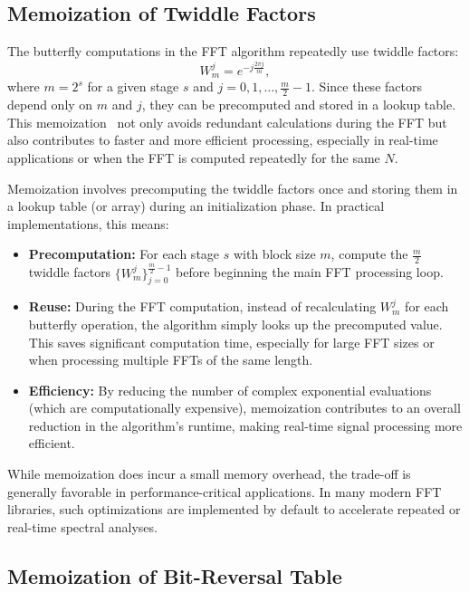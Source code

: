 \documentclass[12pt,letter]{article}
\begin{document}
\subsection{Memoization of Twiddle Factors}

The butterfly computations in the FFT algorithm repeatedly use twiddle
factors:
$$
W_m^j = e^{-j\frac{2\pi j}{m}},
$$
where $m = 2^s$ for a given stage $s$ and $j = 0, 1, \ldots, \frac{m}{2}-1$.
Since these factors depend only on $m$ and $j$, they can be precomputed and
stored in a lookup table. This memoization~\citep{cormen2009introduction} not
only avoids redundant calculations during the FFT but also contributes to
faster and more efficient processing, especially in real-time applications or
when the FFT is computed repeatedly for the same $N$.

Memoization involves precomputing the twiddle factors once and storing them
in a lookup table (or array) during an initialization phase. In practical
implementations, this means:
\begin{itemize}
  \item \textbf{Precomputation:} For each stage $s$ with block size
  $m$, compute the $\frac{m}{2}$ twiddle factors
  $\{W_m^j\}_{j=0}^{\frac{m}{2}-1}$ before beginning the main FFT
  processing loop.
  \item \textbf{Reuse:} During the FFT computation, instead of recalculating
  $W_m^j$ for each butterfly operation, the algorithm simply looks up the
  precomputed value. This saves significant computation time, especially for
  large FFT sizes or when processing multiple FFTs of the same length.
  \item \textbf{Efficiency:} By reducing the number of complex exponential
  evaluations (which are computationally expensive), memoization contributes
  to an overall reduction in the algorithm's runtime, making real-time signal
  processing more efficient.
\end{itemize}

While memoization does incur a small memory overhead, the trade-off is
generally favorable in performance-critical applications. In many modern FFT
libraries, such optimizations are implemented by default to accelerate
repeated or real-time spectral analyses.

\subsection{Memoization of Bit-Reversal Table}
\end{document}
